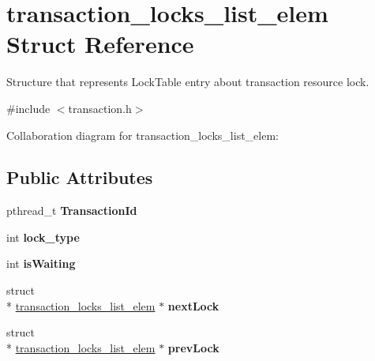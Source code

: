 \hypertarget{structtransaction__locks__list__elem}{\section{transaction\+\_\+locks\+\_\+list\+\_\+elem Struct Reference}
\label{structtransaction__locks__list__elem}
}


Structure that represents Lock\+Table entry about transaction resource lock.  




{\ttfamily \#include $<$transaction.\+h$>$}



Collaboration diagram for transaction\+\_\+locks\+\_\+list\+\_\+elem\+:
\subsection*{Public Attributes}
\begin{DoxyCompactItemize}
\item 
\hypertarget{structtransaction__locks__list__elem_a89663ab688fdc69536811ff376fc2ae1}{pthread\+\_\+t {\bfseries Transaction\+Id}}\label{structtransaction__locks__list__elem_a89663ab688fdc69536811ff376fc2ae1}

\item 
\hypertarget{structtransaction__locks__list__elem_a27e32cb2ffe4dc6d09315686498b552c}{int {\bfseries lock\+\_\+type}}\label{structtransaction__locks__list__elem_a27e32cb2ffe4dc6d09315686498b552c}

\item 
\hypertarget{structtransaction__locks__list__elem_ab6ded356cab32f4bd04bd5993f4e9c53}{int {\bfseries is\+Waiting}}\label{structtransaction__locks__list__elem_ab6ded356cab32f4bd04bd5993f4e9c53}

\item 
\hypertarget{structtransaction__locks__list__elem_a80609433b1b31557377dd3489cc74c51}{struct \\*
\hyperlink{structtransaction__locks__list__elem}{transaction\+\_\+locks\+\_\+list\+\_\+elem} $\ast$ {\bfseries next\+Lock}}\label{structtransaction__locks__list__elem_a80609433b1b31557377dd3489cc74c51}

\item 
\hypertarget{structtransaction__locks__list__elem_acafc0b84518b79c03b7ff9838dc7bb6e}{struct \\*
\hyperlink{structtransaction__locks__list__elem}{transaction\+\_\+locks\+\_\+list\+\_\+elem} $\ast$ {\bfseries prev\+Lock}}\label{structtransaction__locks__list__elem_acafc0b84518b79c03b7ff9838dc7bb6e}

\end{DoxyCompactItemize}


